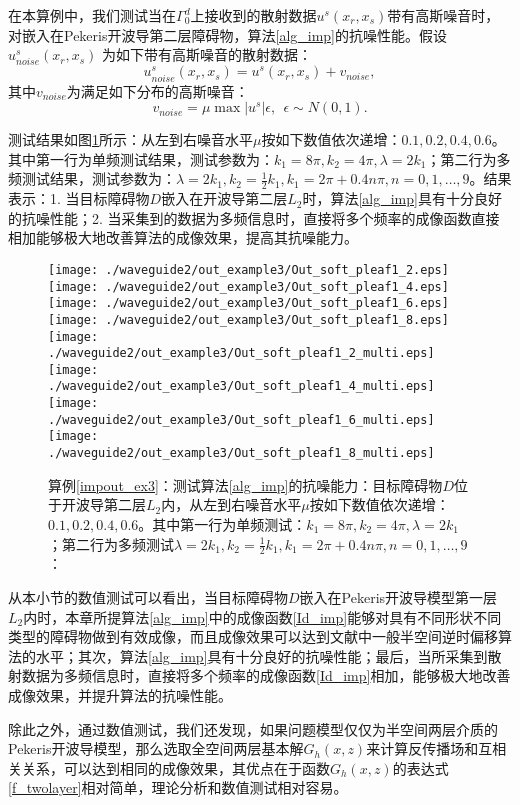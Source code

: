 \begin{example}[抗噪性及多频测试]\label{impout_ex3}
在本算例中，我们测试当在$\Gamma_0^d$上接收到的散射数据$u^s(x_r,x_s)$带有高斯噪音时，对嵌入在Pekeris开波导第二层障碍物，算法\ref{alg_imp}的抗噪性能。假设$u^s_{noise}(x_r,x_s)$ 为如下带有高斯噪音的散射数据：
$$ u^s_{noise}(x_r,x_s)=u^s(x_r,x_s)+v_{noise},$$
其中$v_{noise}$为满足如下分布的高斯噪音：
$$v_{noise}=\mu \max{|u^s|}\epsilon,\ \ \epsilon\sim N(0,1).$$

测试结果如图\ref{fig_impout_ex3}所示：从左到右噪音水平$\mu$按如下数值依次递增：$0.1,0.2,0.4,0.6$。其中第一行为单频测试结果，测试参数为：$k_1=8\pi,k_2=4\pi,\lambda=2k_1$；第二行为多频测试结果，测试参数为：$\lambda=2k_1,k_2=\frac{1}{2}k_1,k_1=2\pi+0.4n\pi,n=0,1,\ldots,9$。结果表示：1. 当目标障碍物$D$嵌入在开波导第二层$L_2$时，算法\ref{alg_imp}具有十分良好的抗噪性能；2. 当采集到的数据为多频信息时，直接将多个频率的成像函数直接相加能够极大地改善算法的成像效果，提高其抗噪能力。
\end{example}
\begin{figure}[h]
  \centering
  \texttt{[image: ./waveguide2/out\_example3/Out\_soft\_pleaf1\_2.eps]}
  \texttt{[image: ./waveguide2/out\_example3/Out\_soft\_pleaf1\_4.eps]}
  \texttt{[image: ./waveguide2/out\_example3/Out\_soft\_pleaf1\_6.eps]}
  \texttt{[image: ./waveguide2/out\_example3/Out\_soft\_pleaf1\_8.eps]}
  \texttt{[image: ./waveguide2/out\_example3/Out\_soft\_pleaf1\_2\_multi.eps]}
  \texttt{[image: ./waveguide2/out\_example3/Out\_soft\_pleaf1\_4\_multi.eps]}
  \texttt{[image: ./waveguide2/out\_example3/Out\_soft\_pleaf1\_6\_multi.eps]}
  \texttt{[image: ./waveguide2/out\_example3/Out\_soft\_pleaf1\_8\_multi.eps]}
  \caption{算例\ref{impout_ex3}：测试算法\ref{alg_imp}的抗噪能力：目标障碍物$D$位于开波导第二层$L_2$内，从左到右噪音水平$\mu$按如下数值依次递增：$0.1,0.2,0.4,0.6$。其中第一行为单频测试：$k_1=8\pi,k_2=4\pi,\lambda=2k_1$；第二行为多频测试$\lambda=2k_1,k_2=\frac{1}{2}k_1,k_1=2\pi+0.4n\pi,n=0,1,\ldots,9$：}\label{fig_impout_ex3}
\end{figure}
\begin{remark}
	从本小节的数值测试可以看出，当目标障碍物$D$嵌入在Pekeris开波导模型第一层$L_2$内时，本章所提算法\ref{alg_imp}中的成像函数\ref{Id_imp}能够对具有不同形状不同类型的障碍物做到有效成像，而且成像效果可以达到文献\cite{ch_ha}中一般半空间逆时偏移算法的水平；其次，算法\ref{alg_imp}具有十分良好的抗噪性能；最后，当所采集到散射数据为多频信息时，直接将多个频率的成像函数\ref{Id_imp}相加，能够极大地改善成像效果，并提升算法的抗噪性能。
	
	除此之外，通过数值测试，我们还发现，如果问题模型仅仅为半空间两层介质的Pekeris开波导模型，那么选取全空间两层基本解$G_h(x,z)$来计算反传播场和互相关关系，可以达到相同的成像效果，其优点在于函数$G_h(x,z)$的表达式\eqref{f_twolayer}相对简单，理论分析和数值测试相对容易。
\end{remark}


